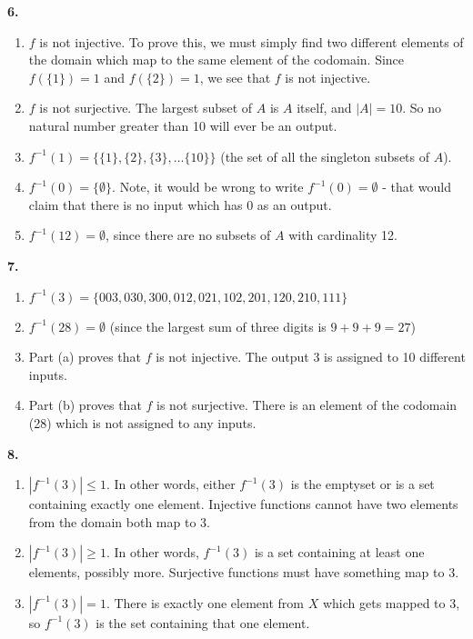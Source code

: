 \documentclass[10pt,]{book}
\theoremstyle{plain}
\theoremstyle{definition}
\theoremstyle{definition}
\theoremstyle{definition}
\numberwithin{equation}{chapter}
\def\inv{^{-1}}
\begin{document}
\par\smallskip
\noindent\textbf{6.}\quad{}\leavevmode%
\begin{enumerate}[label=(\alph*)]
\item\hypertarget{li-326}{}\(f\) is not injective. To prove this, we must simply find two different elements of the domain which map to the same element of the codomain. Since \(f(\{1\}) = 1\) and \(f(\{2\}) = 1\), we see that \(f\) is not injective.%
\item\hypertarget{li-327}{}\(f\) is not surjective. The largest subset of \(A\) is \(A\) itself, and \(|A| = 10\). So no natural number greater than 10 will ever be an output.%
\item\hypertarget{li-328}{}\(f\inv(1) = \{\{1\}, \{2\}, \{3\}, \ldots \{10\}\}\) (the set of all the singleton subsets of \(A\)).%
\item\hypertarget{li-329}{}\(f\inv(0) = \{\emptyset\}\). Note, it would be wrong to write \(f\inv(0) = \emptyset\) - that would claim that there is no input which has 0 as an output.%
\item\hypertarget{li-330}{}\(f\inv(12) = \emptyset\), since there are no subsets of \(A\) with cardinality 12.%
\end{enumerate}
\par\smallskip
\noindent\textbf{7.}\quad{}\leavevmode%
\begin{enumerate}[label=(\alph*)]
\item\hypertarget{li-335}{}\(f\inv(3) = \{003, 030, 300, 012, 021, 102, 201, 120, 210, 111\}\)%
\item\hypertarget{li-336}{}\(f\inv(28) = \emptyset\) (since the largest sum of three digits is \(9+9+9 = 27\))%
\item\hypertarget{li-337}{}
                Part (a) proves that \(f\) is not injective. The output 3 is assigned to 10 different inputs.
\item\hypertarget{li-338}{}
                Part (b) proves that \(f\) is not surjective. There is an element of the codomain (28) which is not assigned to any inputs.
\end{enumerate}
\par\smallskip
\noindent\textbf{8.}\quad{}\leavevmode%
\begin{enumerate}[label=(\alph*)]
\item\hypertarget{li-342}{}\(|f\inv(3)| \le 1\). In other words, either \(f\inv(3)\) is the emptyset or is a set containing exactly one element. Injective functions cannot have two elements from the domain both map to 3.%
\item\hypertarget{li-343}{}\(|f\inv(3)| \ge 1\). In other words, \(f\inv(3)\) is a set containing at least one elements, possibly more. Surjective functions must have something map to 3.%
\item\hypertarget{li-344}{}\(|f\inv(3)| = 1\). There is exactly one element from \(X\) which gets mapped to 3, so \(f\inv(3)\) is the set containing that one element.%
\end{enumerate}
\end{document}
